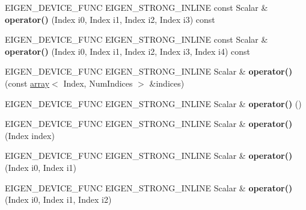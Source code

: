 \begin{DoxyCompactItemize}
\item 
\mbox{\label{class_eigen_1_1_tensor_map_a11b53f82097abb9804acffd26fab9847}} 
E\+I\+G\+E\+N\+\_\+\+D\+E\+V\+I\+C\+E\+\_\+\+F\+U\+NC E\+I\+G\+E\+N\+\_\+\+S\+T\+R\+O\+N\+G\+\_\+\+I\+N\+L\+I\+NE const Scalar \& {\bfseries operator()} (Index i0, Index i1, Index i2, Index i3) const
\item 
\mbox{\label{class_eigen_1_1_tensor_map_a4e253a254b8b3b336749380d1698489c}} 
E\+I\+G\+E\+N\+\_\+\+D\+E\+V\+I\+C\+E\+\_\+\+F\+U\+NC E\+I\+G\+E\+N\+\_\+\+S\+T\+R\+O\+N\+G\+\_\+\+I\+N\+L\+I\+NE const Scalar \& {\bfseries operator()} (Index i0, Index i1, Index i2, Index i3, Index i4) const
\item 
\mbox{\label{class_eigen_1_1_tensor_map_a8276397330363b857fa84f0ddcdd5376}} 
E\+I\+G\+E\+N\+\_\+\+D\+E\+V\+I\+C\+E\+\_\+\+F\+U\+NC E\+I\+G\+E\+N\+\_\+\+S\+T\+R\+O\+N\+G\+\_\+\+I\+N\+L\+I\+NE Scalar \& {\bfseries operator()} (const \hyperlink{class_eigen_1_1array}{array}$<$ Index, Num\+Indices $>$ \&indices)
\item 
\mbox{\label{class_eigen_1_1_tensor_map_ae2ca27252dfd6872df00f3d6199d3c30}} 
E\+I\+G\+E\+N\+\_\+\+D\+E\+V\+I\+C\+E\+\_\+\+F\+U\+NC E\+I\+G\+E\+N\+\_\+\+S\+T\+R\+O\+N\+G\+\_\+\+I\+N\+L\+I\+NE Scalar \& {\bfseries operator()} ()
\item 
\mbox{\label{class_eigen_1_1_tensor_map_a6dfdb32393949783fa2d207b1f4fc060}} 
E\+I\+G\+E\+N\+\_\+\+D\+E\+V\+I\+C\+E\+\_\+\+F\+U\+NC E\+I\+G\+E\+N\+\_\+\+S\+T\+R\+O\+N\+G\+\_\+\+I\+N\+L\+I\+NE Scalar \& {\bfseries operator()} (Index index)
\item 
\mbox{\label{class_eigen_1_1_tensor_map_a814ba01dddc7d064864c9e0b73177546}} 
E\+I\+G\+E\+N\+\_\+\+D\+E\+V\+I\+C\+E\+\_\+\+F\+U\+NC E\+I\+G\+E\+N\+\_\+\+S\+T\+R\+O\+N\+G\+\_\+\+I\+N\+L\+I\+NE Scalar \& {\bfseries operator()} (Index i0, Index i1)
\item 
\mbox{\label{class_eigen_1_1_tensor_map_a349d0ba8aa667a753b255eba778bd1e7}} 
E\+I\+G\+E\+N\+\_\+\+D\+E\+V\+I\+C\+E\+\_\+\+F\+U\+NC E\+I\+G\+E\+N\+\_\+\+S\+T\+R\+O\+N\+G\+\_\+\+I\+N\+L\+I\+NE Scalar \& {\bfseries operator()} (Index i0, Index i1, Index i2)

\end{DoxyCompactItemize}
